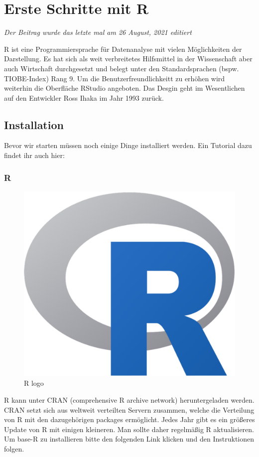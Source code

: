 \documentclass[
]{article}
\begin{document}
\hypertarget{erste-schritte-mit-r}{%
\section{Erste Schritte mit R}\label{erste-schritte-mit-r}}

\emph{Der Beitrag wurde das letzte mal am 26 August, 2021 editiert}

R ist eine Programmiersprache für Datenanalyse mit vielen Möglichkeiten der Darstellung. Es hat sich als weit verbreitetes Hilfsmittel in der Wissenschaft aber auch Wirtschaft durchgesetzt und belegt unter den Standardsprachen (bspw. TIOBE-Index) Rang 9. Um die Benutzerfreundlichkeitt zu erhöhen wird weiterhin die Oberfläche RStudio angeboten. Das Desgin geht im Wesentlichen auf den Entwickler Ross Ihaka im Jahr 1993 zurück.

\hypertarget{installation}{%
\subsection{Installation}\label{installation}}

Bevor wir starten müssen noch einige Dinge installiert werden. Ein Tutorial dazu findet ihr auch hier:

\hypertarget{r}{%
\subsubsection{R}\label{r}}

\begin{figure}

{\centering \includegraphics[width=0.5\linewidth]{images/004} 

}

\caption{R logo}\label{fig:unnamed-chunk-8}
\end{figure}

R kann unter CRAN (comprehensive R archive network) heruntergeladen werden. CRAN setzt sich aus weltweit verteilten Servern zusammen, welche die Verteilung von R mit den dazugehörigen packages ermöglicht. Jedes Jahr gibt es ein größeres Update von R mit einigen kleineren. Man sollte daher regelmäßig R aktualisieren. Um base-R zu installieren bitte den folgenden Link klicken und den Instruktionen folgen.
\end{document}
